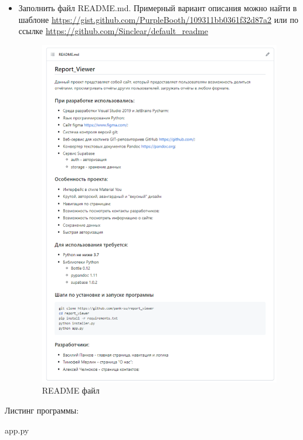 \documentclass[14pt]{extarticle}
\begin{document}
\begin{itemize}
\item Заполнить файл README.md. Примерный вариант описания можно найти в шаблоне \url{https://gist.github.com/PurpleBooth/109311bb0361f32d87a2} или по ссылке \url{https://github.com/Sinclear/default\_readme}
\begin{figure}[H]
\centering
\includegraphics[width=.9\linewidth]{images/2023-04-05_10-36-38_screenshot.png}
\caption{README файл}
\end{figure}
\end{itemize}


Листинг программы:

app.py
\end{document}
